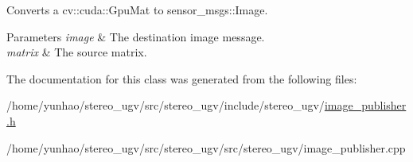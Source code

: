 Converts a cv\+::cuda\+::\+Gpu\+Mat to sensor\+\_\+msgs\+::\+Image. 


\begin{DoxyParams}{Parameters}
{\em image} & The destination image message. \\
\hline
{\em matrix} & The source matrix. \\
\hline
\end{DoxyParams}


The documentation for this class was generated from the following files\+:\begin{DoxyCompactItemize}
\item 
/home/yunhao/stereo\+\_\+ugv/src/stereo\+\_\+ugv/include/stereo\+\_\+ugv/\hyperlink{image__publisher_8h}{image\+\_\+publisher.\+h}\item 
/home/yunhao/stereo\+\_\+ugv/src/stereo\+\_\+ugv/src/stereo\+\_\+ugv/image\+\_\+publisher.\+cpp\end{DoxyCompactItemize}
